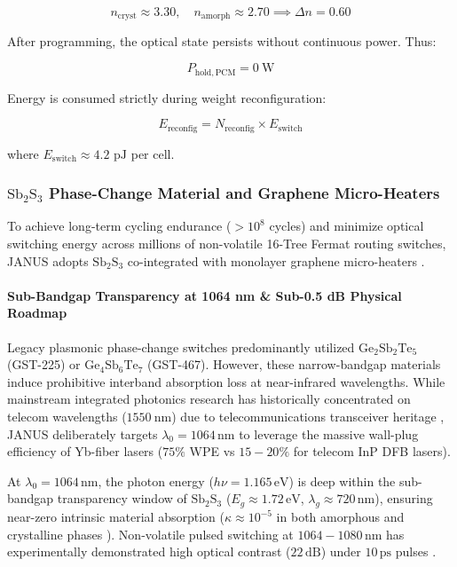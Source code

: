 \documentclass[journal]{IEEEtran}
\begin{document}
\begin{equation}
n_{\mathrm{cryst}} \approx 3.30, \quad n_{\mathrm{amorph}} \approx 2.70 \implies \Delta n = 0.60
\end{equation}

After programming, the optical state persists without continuous power. Thus:

\begin{equation}
P_{\mathrm{hold,PCM}} = 0~\mathrm{W}
\end{equation}

Energy is consumed strictly during weight reconfiguration:

\begin{equation}
E_{\mathrm{reconfig}} = N_{\mathrm{reconfig}} \times E_{\mathrm{switch}}
\end{equation}

where $E_{\mathrm{switch}} \approx 4.2\text{ pJ}$ per cell.



\subsubsection{\textbf{$\mathrm{Sb_2S_3}$ Phase-Change Material and Graphene Micro-Heaters}}

To achieve long-term cycling endurance ($> 10^8$ cycles) and minimize optical switching energy across millions of non-volatile 16-Tree Fermat routing switches, JANUS adopts $\mathrm{Sb_2S_3}$ co-integrated with monolayer graphene micro-heaters \cite{Rios2021}.

\paragraph{\textbf{Sub-Bandgap Transparency at 1064 nm \& Sub-0.5 dB Physical Roadmap}}
Legacy plasmonic phase-change switches predominantly utilized $\mathrm{Ge_2Sb_2Te_5}$ (GST-225) or $\mathrm{Ge_4Sb_6Te_7}$ (GST-467). However, these narrow-bandgap materials induce prohibitive interband absorption loss at near-infrared wavelengths. While mainstream integrated photonics research has historically concentrated on telecom wavelengths ($1550~\mathrm{nm}$) due to telecommunications transceiver heritage \cite{Zhou2024,Bao2025}, JANUS deliberately targets $\lambda_0 = 1064\,\mathrm{nm}$ to leverage the massive wall-plug efficiency of Yb-fiber lasers ($75\%$ WPE vs $15-20\%$ for telecom InP DFB lasers).

At $\lambda_0 = 1064\,\mathrm{nm}$, the photon energy ($h\nu = 1.165\,\mathrm{eV}$) is deep within the sub-bandgap transparency window of $\mathrm{Sb_2S_3}$ ($E_g \approx 1.72\,\mathrm{eV}$, $\lambda_g \approx 720\,\mathrm{nm}$), ensuring near-zero intrinsic material absorption ($\kappa \approx 10^{-5}$ in both amorphous and crystalline phases \cite{Delaney2020,Zhang2023MDM}). Non-volatile pulsed switching at $1064-1080\,\mathrm{nm}$ has experimentally demonstrated high optical contrast ($22\,\mathrm{dB}$) under $10\,\mathrm{ps}$ pulses \cite{PerezFrances2023}. 
\end{document}
